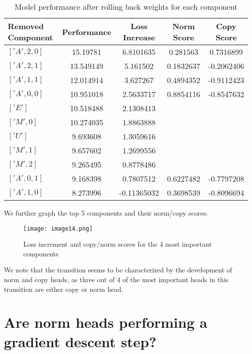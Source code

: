 \documentclass{article}
\begin{document}
\begin{table}[htbp]
  \caption{Model performance after rolling back weights for each component}  %
  \centering
  \begin{tabular}{lcccc}  %
    \toprule
    \cmidrule(r){1-5}  %
    Removed Component & Performance & Loss Increase & Norm Score & Copy Score \\  %
    \midrule
    $['A', 2, 0]$ & 15.19781 & 6.8101635 & 0.281563 & 0.7316899 \\
    $['A', 2, 1]$ & 13.549149 & 5.161502 & 0.1832637 & -0.2062406 \\
    $['A', 1, 1]$ & 12.014914 & 3.627267 & 0.4894352 & -0.9112423 \\
    $['A', 0, 0]$ & 10.951018 & 2.5633717 & 0.8854116 & -0.8547632 \\
    $['E']$ & 10.518488 & 2.1308413 & & \\
    $['M', 0]$ & 10.274035 & 1.8863888 & & \\
    $['U']$ & 9.693608 & 1.3059616 & & \\
    $['M', 1]$ & 9.657602 & 1.2699556 & & \\
    $['M', 2]$ & 9.265495 & 0.8778486 & & \\
    $['A', 0, 1]$ & 9.168398 & 0.7807512 & 0.6227482 & -0.7797208 \\
    $['A', 1, 0]$ & 8.273996 & -0.11365032 & 0.3698539 & -0.8096694 \\
    \bottomrule
  \end{tabular}
\end{table}

\newpage
We further graph the top 5 components and their norm/copy scores:
\begin{figure}[htbp]
\centering
\texttt{[image: image14.png]}
\caption{Loss increment and copy/norm scores for the 4 most important components}
\end{figure}
We note that the transition seems to be characterized by the development of norm and copy heads, as three out of 4 of the most important heads in this transition are either copy or norm head.

\section{Are norm heads performing a gradient descent step?}
\end{document}
